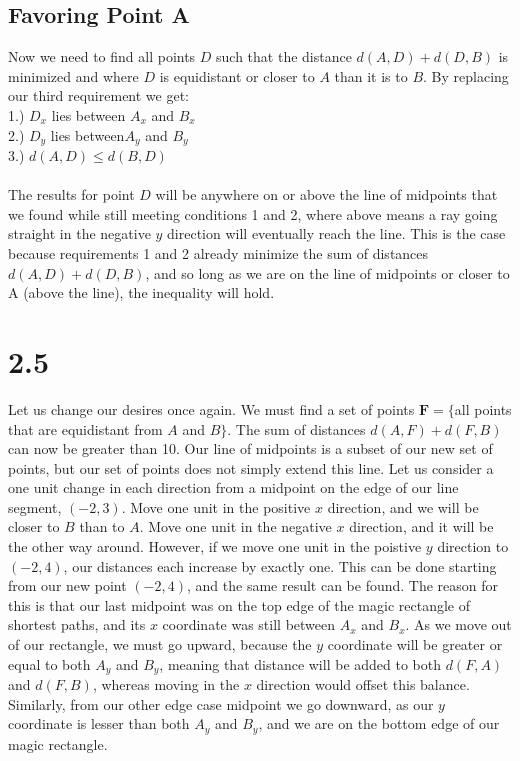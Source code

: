 \documentclass{article}
\begin{document}
\subsection*{Favoring Point A}
Now we need to find all points $D$ such that the distance $d(A,D) + d(D,B)$ is minimized and where $D$ is equidistant or closer to $A$ than it is to $B$.
By replacing our third requirement we get: \\
1.) $D_x$ lies between $A_x$ and $B_x$ \\
2.) $D_y$ lies between$A_y$ and $B_y$ \\
3.) $d(A,D) \leqslant d(B,D)$\\\\
The results for point $D$ will be anywhere on or above the line of midpoints that we found while still meeting conditions 1 and 2, where above means a ray going straight in the negative $y$ direction will eventually reach the line. This is the case because requirements 1 and 2 already minimize the sum of distances $d(A,D) + d(D,B)$, and so long as we are on the line of midpoints or closer to A (above the line), the inequality will hold.

\section*{2.5}
Let us change our desires once again. We must find a set of points $\mathbf{F} = \{$all points that are equidistant from $A$ and $B\}$. The sum of distances $d(A,F) + d(F,B)$ can now be greater than 10. Our line of midpoints is a subset of our new set of points, but our set of points does not simply extend this line. Let us consider a one unit change in each direction from a midpoint on the edge of our line segment, $(-2,3)$. Move one unit in the positive $x$ direction, and we will be closer to $B$ than to $A$. Move one unit in the negative $x$ direction, and it will be the other way around. However, if we move one unit in the poistive $y$ direction to $(-2,4)$, our distances each increase by exactly one. This can be done starting from our new point $(-2,4)$, and the same result can be found. The reason for this is that our last midpoint was on the top edge of the magic rectangle of shortest paths, and its $x$ coordinate was still between $A_x$ and $B_x$. As we move out of our rectangle, we must go upward, because the $y$ coordinate will be greater or equal to both $A_y$ and $B_y$, meaning that distance will be added to both $d(F,A)$ and $d(F,B)$, whereas moving in the $x$ direction would offset this balance. Similarly, from our other edge case midpoint we go downward, as our $y$ coordinate is lesser than both $A_y$ and $B_y$, and we are on the bottom edge of our magic rectangle.
\end{document}
